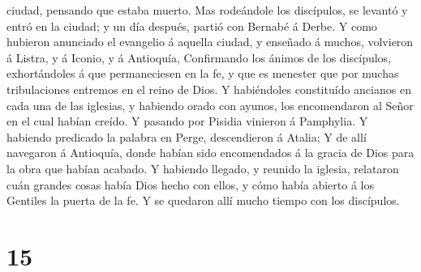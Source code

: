 ciudad, pensando que estaba muerto.  Mas rodeándole los
discípulos, se levantó y entró en la ciudad; y un día después, partió
con Bernabé á Derbe.  Y como hubieron anunciado el
evangelio á aquella ciudad, y enseñado á muchos, volvieron á Listra, y á
Iconio, y á Antioquía,  Confirmando los ánimos de los
discípulos, exhortándoles á que permaneciesen en la fe, y que es
menester que por muchas tribulaciones entremos en el reino de Dios.
 Y habiéndoles constituído ancianos en cada una de las
iglesias, y habiendo orado con ayunos, los encomendaron al Señor en el
cual habían creído.  Y pasando por Pisidia vinieron á
Pamphylia.  Y habiendo predicado la palabra en Perge,
descendieron á Atalia;  Y de allí navegaron á Antioquía,
donde habían sido encomendados á la gracia de Dios para la obra que
habían acabado.  Y habiendo llegado, y reunido la
iglesia, relataron cuán grandes cosas había Dios hecho con ellos, y cómo
había abierto á los Gentiles la puerta de la fe.  Y se
quedaron allí mucho tiempo con los discípulos.

\hypertarget{section-14}{%
\section{15}\label{section-14}}

